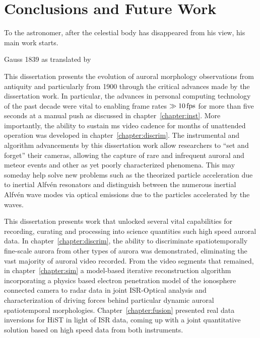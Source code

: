 \chapter{Conclusions and Future Work}
\label{chapter:Conclusions}
\thispagestyle{myheadings}
\graphicspath{{Concl/Figures/}}

\setlength{\epigraphwidth}{0.85\textwidth}
\epigraph{To the astronomer, after the celestial body has disappeared from his view, his main work starts.}{Gauss 1839 as translated by \citet{gauss1839}}

This dissertation presents the evolution of auroral morphology observations from antiquity and particularly from 1900 through the critical advances made by the dissertation work.
In particular, the advances in personal computing technology of the past decade were vital to enabling frame rates $\gg \unit[10]{fps}$ for more than five seconds at a manual push as discussed in chapter~\ref{chapter:inst}.
More importantly, the ability to sustain \unit[20]{ms} video cadence for months of unattended operation was developed in chapter~\ref{chapter:discrim}.
The instrumental and algorithm advancements by this dissertation work allow researchers to ``set and forget'' their cameras, allowing the capture of rare and infrequent auroral and meteor events and other as yet poorly characterized phenomena.
This may someday help solve new problems such as the theorized particle acceleration due to inertial Alfvén resonators and distinguish between the numerous inertial Alfvén wave modes via optical emissions due to the particles accelerated by the waves.

This dissertation presents work that unlocked several vital capabilities for recording, curating and processing into science quantities such high speed auroral data.
In chapter~\ref{chapter:discrim}, the ability to discriminate spatiotemporally fine-scale aurora from other types of aurora was demonstrated, eliminating the vast majority of auroral video recorded.
From the video segments that remained, in chapter~\ref{chapter:sim} a model-based iterative reconstruction algorithm incorporating a physics based electron penetration model of the ionosphere connected camera to radar data in joint ISR-Optical analysis and characterization of driving forces behind particular dynamic auroral spatiotemporal morphologies.
Chapter~\ref{chapter:fusion} presented real data inversions for HiST in light of ISR data, coming up with a joint quantitative solution based on high speed data from both instruments.

